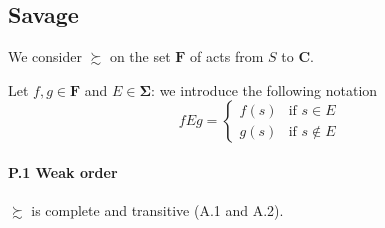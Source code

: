 \documentclass[landscape, 12pt]{extarticle}
\begin{document}
\begin{multicols}{2}

	\subsection{Savage}
	We consider $\succsim$ on the set $\bm F$ of acts from $S$ to $\bm C$.

	Let $f, g \in \bm F$ and $E \in \bm \Sigma$: we introduce the following notation
	\[
		fEg = \begin{cases}
			f(s) & \text{if } s \in E    \\
			g(s) & \text{if } s \notin E
		\end{cases}
	\]

	\paragraph{P.1 Weak order}
	$\succsim$ is complete and transitive (A.1 and A.2).


\end{multicols}
\end{document}
